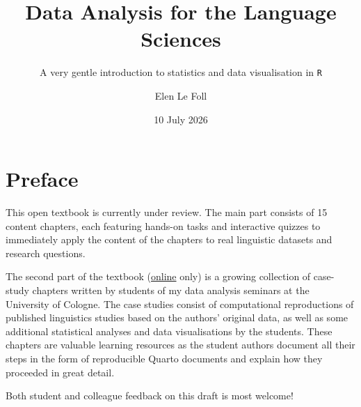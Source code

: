 \documentclass[
  letterpaper,
  DIV=11,
  numbers=noendperiod]{scrreprt}
\title{Data Analysis for the Language Sciences}
\subtitle{A very gentle introduction to statistics and data
visualisation in \texttt{R}}
\author{Elen Le Foll}
\date{10 July 2026}
\renewcommand*\contentsname{Table of contents}
\newcommand\contentsname{Table of contents}
\begin{document}
\maketitle


\renewcommand*\contentsname{Table of contents}
{
\setcounter{tocdepth}{2}
\tableofcontents
}


\chapter*{Preface}\label{preface}


\begin{tcolorbox}[enhanced jigsaw, arc=.35mm, bottomrule=.15mm, bottomtitle=1mm, breakable, colback=white, colbacktitle=quarto-callout-note-color!10!white, colframe=quarto-callout-note-color-frame, coltitle=black, left=2mm, leftrule=.75mm, opacityback=0, opacitybacktitle=0.6, rightrule=.15mm, title=\textcolor{quarto-callout-note-color}{\faInfo}\hspace{0.5em}{Note}, titlerule=0mm, toprule=.15mm, toptitle=1mm]

This open textbook is currently under review. The main part consists of
15 content chapters, each featuring hands-on tasks and interactive
quizzes to immediately apply the content of the chapters to real
linguistic datasets and research questions.

The second part of the textbook
(\href{https://elenlefoll.github.io/RstatsTextbook/}{online} only) is a
growing collection of case-study chapters written by students of my data
analysis seminars at the University of Cologne. The case studies consist
of computational reproductions of published linguistics studies based on
the authors' original data, as well as some additional statistical
analyses and data visualisations by the students. These chapters are
valuable learning resources as the student authors document all their
steps in the form of reproducible Quarto documents and explain how they
proceeded in great detail.

Both student and colleague feedback on this draft is most welcome!
\href{mailto:elefoll@uni-koeln.de}{️}

\end{tcolorbox}
\end{document}
